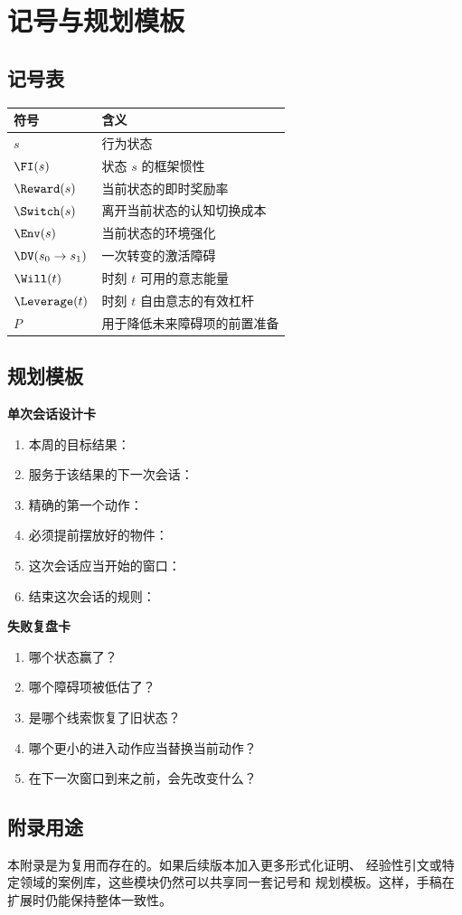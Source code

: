 \chapter{记号与规划模板}
\label{app:notation}

\section{记号表}

\begin{center}
\begin{tabularx}{\textwidth}{@{}l X@{}}
\toprule
符号 & 含义 \\
\midrule
$s$ & 行为状态 \\
$\FI(s)$ & 状态 $s$ 的框架惯性 \\
$\Reward(s)$ & 当前状态的即时奖励率 \\
$\Switch(s)$ & 离开当前状态的认知切换成本 \\
$\Env(s)$ & 当前状态的环境强化 \\
$\DV(s_0 \to s_1)$ & 一次转变的激活障碍 \\
$\Will(t)$ & 时刻 $t$ 可用的意志能量 \\
$\Leverage(t)$ & 时刻 $t$ 自由意志的有效杠杆 \\
$P$ & 用于降低未来障碍项的前置准备 \\
\bottomrule
\end{tabularx}
\end{center}

\section{规划模板}

\begin{templatebox}
\textbf{单次会话设计卡}
\begin{enumerate}[nosep]
  \item 本周的目标结果：
  \item 服务于该结果的下一次会话：
  \item 精确的第一个动作：
  \item 必须提前摆放好的物件：
  \item 这次会话应当开始的窗口：
  \item 结束这次会话的规则：
\end{enumerate}
\end{templatebox}

\begin{templatebox}
\textbf{失败复盘卡}
\begin{enumerate}[nosep]
  \item 哪个状态赢了？
  \item 哪个障碍项被低估了？
  \item 是哪个线索恢复了旧状态？
  \item 哪个更小的进入动作应当替换当前动作？
  \item 在下一次窗口到来之前，会先改变什么？
\end{enumerate}
\end{templatebox}

\section{附录用途}

本附录是为复用而存在的。如果后续版本加入更多形式化证明、
经验性引文或特定领域的案例库，这些模块仍然可以共享同一套记号和
规划模板。这样，手稿在扩展时仍能保持整体一致性。